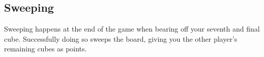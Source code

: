 \subsection{Sweeping}
Sweeping happens at the end of the game when bearing off your seventh and final cube.
Successfully doing so sweeps the board, giving you the other player's remaining cubes as points.
